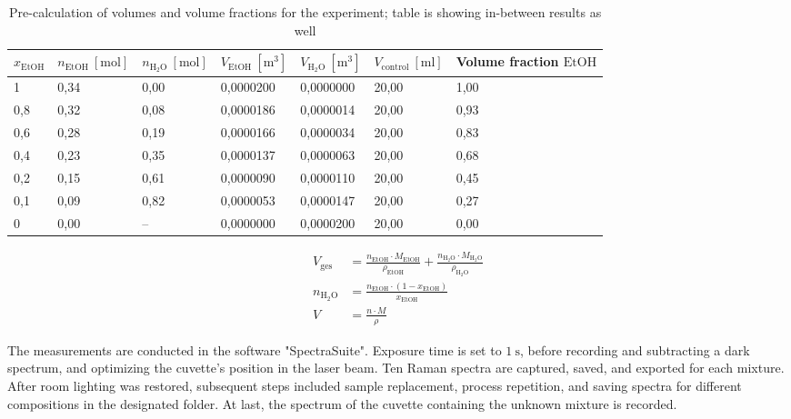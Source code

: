 \begin{table}[!htb]
    \centering
    \small
    \caption[Pre-calculation of volumes and volume fractions]{Pre-calculation of volumes and volume fractions for the experiment; table is showing in-between results as well}
    \label{tab:ethanol-conc}
    \vspace{12pt}
    \begin{tabularx}{\textwidth}{|l|l|l|l|l|l|X|}
        \hline 
        \rowcolor{lightgray} $x_\mathrm{EtOH}$ & $n_\mathrm{EtOH}~\mathrm{[mol]}$ & $n_\mathrm{H_2O}~\mathrm{[mol]}$ & $V_\mathrm{EtOH}~\mathrm{[m^3]}$ & $V_\mathrm{H_2O}~\mathrm{[m^3]}$ & $V_\mathrm{control}~\mathrm{[ml]}$ & Volume fraction $\mathrm{EtOH}$ \\ \hline \hline
        1	& 0,34 & 	0,00 & 	0,0000200 & 	0,0000000 & 	20,00 & 	1,00  \\ \hline
        0,8	& 0,32 & 	0,08 & 	0,0000186 & 	0,0000014 & 	20,00 & 	0,93  \\ \hline
        0,6	& 0,28 & 	0,19 & 	0,0000166 & 	0,0000034 & 	20,00 & 	0,83  \\ \hline
        0,4	& 0,23 & 	0,35 & 	0,0000137 & 	0,0000063 & 	20,00 & 	0,68  \\ \hline
        0,2	& 0,15 & 	0,61 & 	0,0000090 & 	0,0000110 & 	20,00 & 	0,45  \\ \hline
        0,1	& 0,09 & 	0,82 & 	0,0000053 & 	0,0000147 & 	20,00 & 	0,27  \\ \hline
        0	& 0,00 & 	--	 &  0,0000000 &  	0,0000200 &  	20,00 &  	0,00  \\ \hline

    \end{tabularx}
\end{table}

\begin{align}
    V_\mathrm{ges}&=\frac{n_\mathrm{EtOH} \cdot M_\mathrm{EtOH}}{\rho_\mathrm{EtOH}} + \frac{n_\mathrm{H_2O} \cdot M_\mathrm{H_2O}}{\rho_\mathrm{H_2O}} \\[6pt]
    n_\mathrm{H_2O}&=\frac{n_\mathrm{EtOH} \cdot (1-x_\mathrm{EtOH})}{x_\mathrm{EtOH}} \\[6pt]
    V&=\frac{n \cdot M}{\rho}
\end{align}

The measurements are conducted in the software "SpectraSuite". Exposure time is set to $1~\mathrm{s}$, before recording and subtracting a dark spectrum, and optimizing the cuvette's position in the laser beam. Ten Raman spectra are captured, saved, and exported for each mixture. After room lighting was restored, subsequent steps included sample replacement, process repetition, and saving spectra for different compositions in the designated folder. At last, the spectrum of the cuvette containing the unknown mixture is recorded.

